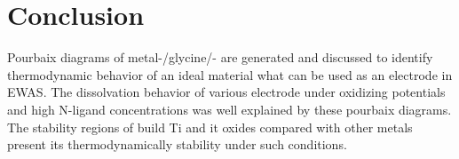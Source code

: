 \documentclass[journal=jacsat,manuscript=article]{achemso}
\begin{document}
\section{Conclusion}
Pourbaix diagrams of metal-/glycine/- are generated and discussed to identify thermodynamic behavior of an ideal material what can be used as an electrode in EWAS. The dissolvation behavior of various electrode under oxidizing potentials and high N-ligand concentrations was well explained by these pourbaix diagrams. The stability regions of build Ti and it oxides compared with other metals present its thermodynamically stability under such conditions. 





\end{document}
